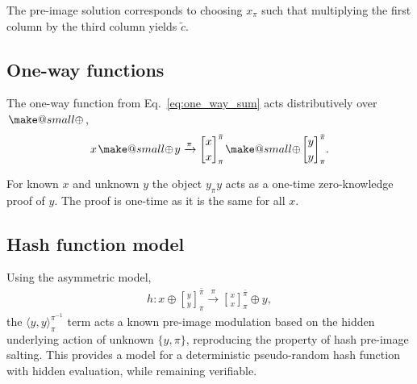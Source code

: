 \documentclass[twocolumn, aps, amsmath, amssymb, nofootinbib, superscriptaddress, longbibliography, doublefloatfix, table-of-contents, eqsecnum, rmp]{revtex4-2}
\makeatletter
\def\braid#1#2#3#4{\langle#1,#2\rangle_{#3}^{#4}}
\def\selfbraid#1#2#3{\langle#1\rangle_{#2}^{#3}}
\def\comm#1#2#3#4{[#1,#2]_{#3}^{#4}}
\newcommand{\stackbraid}[2]{{\genfrac{[}{]}{0pt}{}{{#1}}{{#2}}}^{\bar{\pi}}_{\pi}}
\newcommand{\soplus}{{{\hspace{1pt}}{\mathbin{\mathpalette\make@small{\mathbin\oplus}}}}{\hspace{1pt}}}
\newcommand{\make@small}[2]{%
  \vcenter{\hbox{%
    \scalebox{0.6}{$\m@th#1#2$}%
  }}%
}
\makeatother
\begin{document}
The pre-image solution corresponds to choosing $x_\pi$ such that multiplying the first column by the third column yields $\tilde{c}$.

\subsection{One-way functions}

The one-way function from Eq.~\eqref{eq:one_way_sum} acts distributively over $\soplus$,
\begin{align}
	x\soplus y \xrightarrow{\pi} \stackbraid{x}{x} \soplus \stackbraid{y}{y}.
\end{align}


For known $x$ and unknown $y$ the object $y_\pi y$ acts as a one-time zero-knowledge proof of $y$. The proof is one-time as it is the same for all $x$.

\subsection{Hash function model}

Using the asymmetric model,
\begin{align}
	h: x\oplus \stackbraid{y}{y} \xrightarrow{\pi} \stackbraid{x}{x} \oplus y,
\end{align}
the $\braid{y}{y}{\pi}{\pi^{-1}}$ term acts a known pre-image modulation based on the hidden underlying action of unknown $\{y,\pi\}$, reproducing the property of hash pre-image salting. This provides a model for a deterministic pseudo-random hash function with hidden evaluation, while remaining verifiable.
\end{document}
